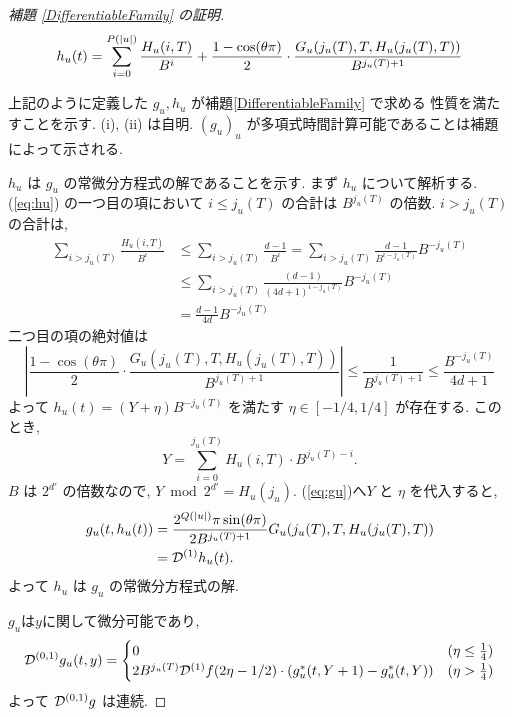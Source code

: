 \begin{proof}[\rm 補題 \ref{DifferentiableFamily} の証明]
 \begin{equation} 
  h_u(t) = \sum^{{P(|u|)}}_{i=0} \frac{H_u(i, T)}{B^i}  
  + \frac{1-\cos(\theta\pi)}{2} 
  \cdot \frac{G_u(j_u(T), T, H_u(j_u(T), T))}{B^{j_u(T)+1}} \label{eq:hu}
 \end{equation}

 上記のように定義した $g_u, h_u$ が補題\ref{DifferentiableFamily} で求める
 性質を満たすことを示す. (i), (ii) は自明. 
 $(g_u)_u$ が多項式時間計算可能であることは補題によって示される.

 $h_u$ は $g_u$ の常微分方程式の解であることを示す.
 まず $h_u$ について解析する. (\ref{eq:hu}) の一つ目の項において
 $i \le j_u(T)$ の合計は $B^{j_u(T)}$ の倍数. $i > j_u(T)$ の合計は, 
 \begin{align*}
  \sum_{i>j_u(T)} \frac{H_u(i, T)}{B^i} 
  & \le \sum_{i>j_u(T)} \frac{d-1}{B^i} 
   = \sum_{i>j_u(T)} \frac{d-1}{B^{i-j_u(T)}}B^{-j_u(T)} \\
  & \le \sum_{i>j_u(T)} \frac{(d-1)}{(4d+1)^{i-j_u(T)}}B^{-j_u(T)} \\
  & = \frac{d-1}{4d}B^{-j_u(T)}
 \end{align*}
 二つ目の項の絶対値は
 \begin{equation}
  \left| \frac{1-\cos(\theta\pi)}{2} 
   \cdot \frac{G_u(j_u(T), T, H_u(j_u(T), T))}{B^{j_u(T)+1}} \right|
  \le \frac{1}{B^{j_u(T)+1}}
  \le \frac{B^{-j_u(T)}}{4d+1}
 \end{equation}
 よって $h_u(t) = (Y + \eta) B^{-j_u(T)}$ を満たす $\eta \in [-1/4, 1/4]$
 が存在する. このとき,
 \begin{equation}
  Y = \sum_{i=0}^{j_u(T)}H_u(i, T) \cdot B^{j_u(T) - i} .
 \end{equation}
 $B$ は $2^{d'}$ の倍数なので, $Y \bmod 2^{d'} = H_u(j_u)$. 
 (\ref{eq:gu})へ$Y$ と $\eta$ を代入すると,
 \begin{align*}
   g_u(t, h_u(t)) 
  & =  \frac{2^{Q(|u|)} \pi \sin(\theta\pi)}{2B^{j_u(T)+1}}
   G_u(j_u(T), T, H_u(j_u(T), T)) \\
  & =  \mathcal D^{(1)}h_u(t).
 \end{align*}
 よって $h_u$ は $g_u$ の常微分方程式の解.

 $g_u$は$y$に関して微分可能であり,
 \begin{equation}
  \mathcal D^{(0,1)} g_u(t, y)
  = \begin{cases}
     0 & (\eta \le \frac 1 4) \\
     2B^{j_u(T)}\mathcal D^{(1)}f(2\eta- 1/2)
      \cdot (g^*_u (t, Y+1)-g^*_u(t, Y))
     & (\eta > \frac 1 4)
    \end{cases}
 \end{equation}
 よって $\mathcal D^{(0,1)} g$ は連続.


\end{proof}
